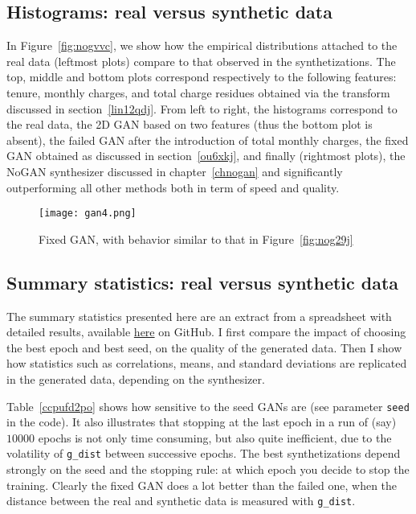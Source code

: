 \documentclass[oneside,10pt]{book}
\begin{document}
\subsection{Histograms: real versus synthetic data}

In Figure~\ref{fig:nogvvc}, we  show how the empirical distributions attached to the real data (leftmost plots)
 compare  to that observed in the synthetizations. The top, middle and bottom plots correspond respectively to the following features:
 tenure, monthly charges, and total charge residues obtained via the transform discussed in section~\ref{lin12qdj}.
From left to right, the histograms correspond to the real data, the 2D GAN based on two features (thus the bottom plot is absent), 
 the failed GAN after the introduction of total monthly charges, the fixed GAN obtained as discussed in section~\ref{ou6xkj}, 
 and finally (rightmost plots), the NoGAN synthesizer discussed in chapter~\ref{chnogan} and significantly outperforming all other methods both in term of
 speed and quality.


\begin{figure}[H]
\centering
\texttt{[image: gan4.png]} %
\caption{Fixed GAN, with behavior similar to that in Figure~\ref{fig:nog29j}}
\label{fig:nog29jcz}
\end{figure}

\subsection{Summary statistics: real versus synthetic data}

The summary statistics presented here are an extract from a spreadsheet with detailed results, available 
\href{https://github.com/VincentGranville/Main/blob/main/telecom.xlsx}{here} on GitHub. 
 I first compare the impact of choosing the best epoch and best seed, on the quality of the generated data. Then I show how statistics such as correlations, means, and standard deviations are replicated in the generated data, depending on the synthesizer.

Table~\ref{ccpufd2po} shows how sensitive to the seed GANs are (see parameter \texttt{seed} in the code).
 It also illustrates that stopping at the last epoch in a run of (say) $\num{10000}$ epochs is not only time consuming, but
 also quite inefficient, due to the volatility of \texttt{g\_dist} between successive epochs. The best synthetizations depend
 strongly on the seed and the \textcolor{index}{stopping rule}: at which epoch you decide to stop the training. Clearly the fixed GAN does a lot better than the failed one, when the distance between the real and synthetic data
 is measured with \texttt{g\_dist}.
\end{document}
